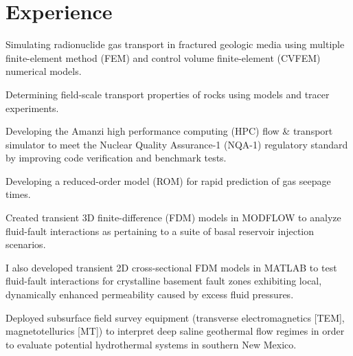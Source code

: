 \documentclass[]{deedy-resume-openfont}
\begin{document}
\begin{minipage}[t]{0.60\textwidth}


\section{Experience}

\vspace{\topsep} %
\begin{tightemize}
	\item Simulating radionuclide gas transport in fractured geologic media using multiple finite-element method (FEM) and control volume finite-element (CVFEM) numerical models.
	\item Determining field-scale transport properties of rocks using models and tracer experiments.
	\item Developing the Amanzi high performance computing (HPC) flow \& transport simulator to meet the Nuclear Quality Assurance-1 (NQA-1) regulatory standard by improving code verification and benchmark tests.
	\item Developing a reduced-order model (ROM) for rapid prediction of gas seepage times.
\end{tightemize}
\sectionsep

\begin{tightemize}
	\item Created transient 3D finite-difference (FDM) models in MODFLOW to analyze fluid-fault interactions as pertaining to a suite of basal reservoir injection scenarios. 
	\item I also developed transient 2D cross-sectional FDM models in MATLAB to test fluid-fault interactions for crystalline basement fault zones exhibiting local, dynamically enhanced permeability caused by excess fluid pressures.
	\item Deployed subsurface field survey equipment (transverse electromagnetics [TEM], magnetotellurics [MT]) to interpret deep saline geothermal flow regimes in order to evaluate potential hydrothermal systems in southern New Mexico.
\end{tightemize}
\sectionsep


\end{minipage}
\end{document}
